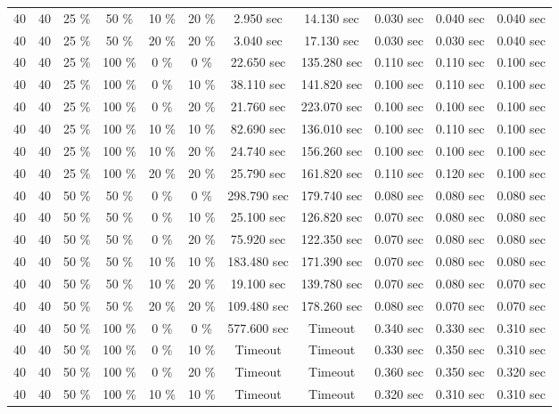 \documentclass{article}
\begin{document}
\begin{longtable}[]{@{}ccccccccccc@{}}
40 & 40 & 25 \% & 50 \% & 10 \% & 20 \% & 2.950 sec & 14.130 sec & 0.030 sec & 0.040 sec & 0.040 sec \\
40 & 40 & 25 \% & 50 \% & 20 \% & 20 \% & 3.040 sec & 17.130 sec & 0.030 sec & 0.030 sec & 0.040 sec \\
40 & 40 & 25 \% & 100 \% & 0 \% & 0 \% & 22.650 sec & 135.280 sec & 0.110 sec & 0.110 sec & 0.100 sec \\
40 & 40 & 25 \% & 100 \% & 0 \% & 10 \% & 38.110 sec & 141.820 sec & 0.100 sec & 0.110 sec & 0.100 sec \\
40 & 40 & 25 \% & 100 \% & 0 \% & 20 \% & 21.760 sec & 223.070 sec & 0.100 sec & 0.100 sec & 0.100 sec \\
40 & 40 & 25 \% & 100 \% & 10 \% & 10 \% & 82.690 sec & 136.010 sec & 0.100 sec & 0.110 sec & 0.100 sec \\
40 & 40 & 25 \% & 100 \% & 10 \% & 20 \% & 24.740 sec & 156.260 sec & 0.100 sec & 0.100 sec & 0.100 sec \\
40 & 40 & 25 \% & 100 \% & 20 \% & 20 \% & 25.790 sec & 161.820 sec & 0.110 sec & 0.120 sec & 0.100 sec \\
40 & 40 & 50 \% & 50 \% & 0 \% & 0 \% & 298.790 sec & 179.740 sec & 0.080 sec & 0.080 sec & 0.080 sec \\
40 & 40 & 50 \% & 50 \% & 0 \% & 10 \% & 25.100 sec & 126.820 sec & 0.070 sec & 0.080 sec & 0.080 sec \\
40 & 40 & 50 \% & 50 \% & 0 \% & 20 \% & 75.920 sec & 122.350 sec & 0.070 sec & 0.080 sec & 0.080 sec \\
40 & 40 & 50 \% & 50 \% & 10 \% & 10 \% & 183.480 sec & 171.390 sec & 0.070 sec & 0.080 sec & 0.080 sec \\
40 & 40 & 50 \% & 50 \% & 10 \% & 20 \% & 19.100 sec & 139.780 sec & 0.070 sec & 0.080 sec & 0.070 sec \\
40 & 40 & 50 \% & 50 \% & 20 \% & 20 \% & 109.480 sec & 178.260 sec & 0.080 sec & 0.070 sec & 0.070 sec \\
40 & 40 & 50 \% & 100 \% & 0 \% & 0 \% & 577.600 sec & Timeout & 0.340 sec & 0.330 sec & 0.310 sec \\
40 & 40 & 50 \% & 100 \% & 0 \% & 10 \% & Timeout & Timeout & 0.330 sec & 0.350 sec & 0.310 sec \\
40 & 40 & 50 \% & 100 \% & 0 \% & 20 \% & Timeout & Timeout & 0.360 sec & 0.350 sec & 0.320 sec \\
40 & 40 & 50 \% & 100 \% & 10 \% & 10 \% & Timeout & Timeout & 0.320 sec & 0.310 sec & 0.310 sec \\

\end{longtable}
\end{document}
